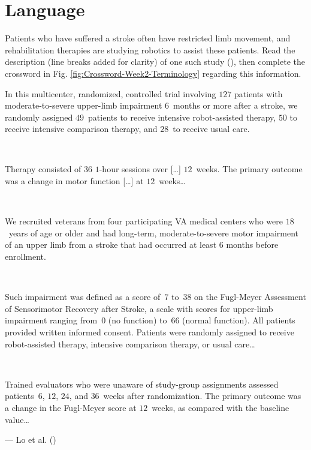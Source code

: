 \documentclass[
  11pt,
  a4paper,
  krantz2]{krantz}
\makeatletter
\renewenvironment{quote}%
{\begin{kframe}}
{\end{kframe}}
\newenvironment{kframe}{%
\medskip{}
\setlength{\fboxsep}{.8em}
 \def\at@end@of@kframe{}%
 \ifinner\ifhmode%
  \def\at@end@of@kframe{\end{minipage}}%
  \begin{minipage}{\columnwidth}%
 \fi\fi%
 \def\FrameCommand##1{\hskip\@totalleftmargin \hskip-\fboxsep
 \colorbox{shadecolor}{##1}\hskip-\fboxsep
     \hskip-\linewidth \hskip-\@totalleftmargin \hskip\columnwidth}%
 \MakeFramed {\advance\hsize-\width
   \@totalleftmargin\z@ \linewidth\hsize
   \@setminipage}}%
 {\par\unskip\endMakeFramed%
 \at@end@of@kframe}
\renewenvironment{quote}
               {\list{}{\vspace{-0.5em}\begin{kframe}\small%
                        \rightmargin   \leftmargin
                        \parsep        \z@ \@plus\p@}%
                \item\relax}
               {\end{kframe}\endlist}
\makeatother
\begin{document}
\section{Language}\label{LanguageReport}

Patients who have suffered a stroke often have restricted limb movement, and rehabilitation therapies are studying robotics to assist these patients.
Read the description (line breaks added for clarity) of one such study (), then complete the crossword
in Fig. \ref{fig:Crossword-Week2-Terminology}
regarding this information.

\begin{quote}
In this multicenter, randomized, controlled trial involving \(127\) patients with moderate-to-severe upper-limb impairment \(6\)~months or more after a stroke, we randomly assigned \(49\)~patients to receive intensive robot-assisted therapy, \(50\) to receive intensive comparison therapy, and \(28\)~to receive usual care.\\
\strut ~

Therapy consisted of \(36\) \(1\)-hour sessions over {[}\ldots{]} \(12\)~weeks.
The primary outcome was a change in motor function {[}\ldots{]} at \(12\)~weeks\ldots{}\\
\strut ~

We recruited veterans from four participating VA medical centers who were \(18\)~years of age or older and had long-term, moderate-to-severe motor impairment of an upper limb from a stroke that had occurred at least \(6\) months before enrollment.\\
\strut ~

Such impairment was defined as a score of~\(7\) to~\(38\) on the Fugl-Meyer Assessment of Sensorimotor Recovery after Stroke, a scale with scores for upper-limb impairment ranging from~\(0\) (no function) to~\(66\) (normal function).
All patients provided written informed consent.
Patients were randomly assigned to receive robot-assisted therapy, intensive comparison therapy, or usual care\ldots{}\\
\strut ~

Trained evaluators who were unaware of study-group assignments assessed patients~\(6\), \(12\), \(24\), and \(36\)~weeks after randomization.
The primary outcome was a change in the Fugl-Meyer score at \(12\)~weeks, as compared with the baseline value\ldots{}

--- Lo et al. ()
\end{quote}
\end{document}
